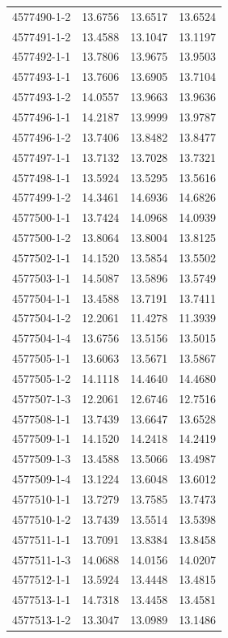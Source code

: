 \begin{longtable}{lrrr}
4577490-1-2 & 13.6756 & 13.6517 & 13.6524 \\
4577491-1-2 & 13.4588 & 13.1047 & 13.1197 \\
4577492-1-1 & 13.7806 & 13.9675 & 13.9503 \\
4577493-1-1 & 13.7606 & 13.6905 & 13.7104 \\
4577493-1-2 & 14.0557 & 13.9663 & 13.9636 \\
4577496-1-1 & 14.2187 & 13.9999 & 13.9787 \\
4577496-1-2 & 13.7406 & 13.8482 & 13.8477 \\
4577497-1-1 & 13.7132 & 13.7028 & 13.7321 \\
4577498-1-1 & 13.5924 & 13.5295 & 13.5616 \\
4577499-1-2 & 14.3461 & 14.6936 & 14.6826 \\
4577500-1-1 & 13.7424 & 14.0968 & 14.0939 \\
4577500-1-2 & 13.8064 & 13.8004 & 13.8125 \\
4577502-1-1 & 14.1520 & 13.5854 & 13.5502 \\
4577503-1-1 & 14.5087 & 13.5896 & 13.5749 \\
4577504-1-1 & 13.4588 & 13.7191 & 13.7411 \\
4577504-1-2 & 12.2061 & 11.4278 & 11.3939 \\
4577504-1-4 & 13.6756 & 13.5156 & 13.5015 \\
4577505-1-1 & 13.6063 & 13.5671 & 13.5867 \\
4577505-1-2 & 14.1118 & 14.4640 & 14.4680 \\
4577507-1-3 & 12.2061 & 12.6746 & 12.7516 \\
4577508-1-1 & 13.7439 & 13.6647 & 13.6528 \\
4577509-1-1 & 14.1520 & 14.2418 & 14.2419 \\
4577509-1-3 & 13.4588 & 13.5066 & 13.4987 \\
4577509-1-4 & 13.1224 & 13.6048 & 13.6012 \\
4577510-1-1 & 13.7279 & 13.7585 & 13.7473 \\
4577510-1-2 & 13.7439 & 13.5514 & 13.5398 \\
4577511-1-1 & 13.7091 & 13.8384 & 13.8458 \\
4577511-1-3 & 14.0688 & 14.0156 & 14.0207 \\
4577512-1-1 & 13.5924 & 13.4448 & 13.4815 \\
4577513-1-1 & 14.7318 & 13.4458 & 13.4581 \\
4577513-1-2 & 13.3047 & 13.0989 & 13.1486 \\

\end{longtable}
